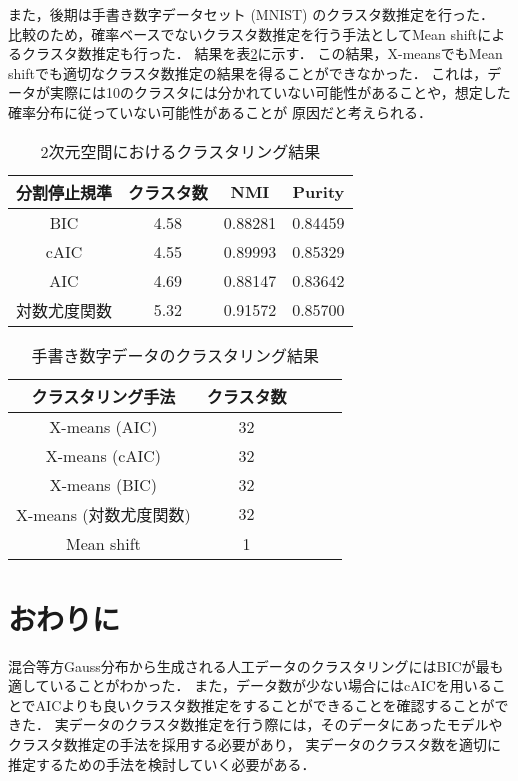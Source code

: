 \documentclass[twocolumn, 10.5pt,a4j]{ltjsarticle}
\def\tableref#1{表\ref{#1}}
\begin{document}
また，後期は手書き数字データセット (MNIST) のクラスタ数推定を行った．
比較のため，確率ベースでないクラスタ数推定を行う手法としてMean shiftによるクラスタ数推定も行った．
結果を\tableref{table:mnist}に示す．
この結果，X-meansでもMean shiftでも適切なクラスタ数推定の結果を得ることができなかった．
これは，データが実際には10のクラスタには分かれていない可能性があることや，想定した確率分布に従っていない可能性があることが
原因だと考えられる．

\begin{table}[htb]
  \centering
  \caption{2次元空間におけるクラスタリング結果}
  \label{table:2dim}
  \begin{tabular}{|c|c|c|c|} \hline
    分割停止規準 & クラスタ数 & NMI & Purity \\\hline
    BIC  & 4.58 & 0.88281 & 0.84459\\
    cAIC & 4.55 & 0.89993 & 0.85329\\
    AIC  & 4.69 & 0.88147 & 0.83642\\
    対数尤度関数 & 5.32 & 0.91572 & 0.85700\\\hline
  \end{tabular}
\end{table}

\begin{table}[htb]
  \centering
  \caption{手書き数字データのクラスタリング結果}
  \label{table:mnist}
  \begin{tabular}{|c|c|c|c|c|} \hline
    クラスタリング手法 & クラスタ数\\\hline
    X-means (AIC) & 32\\
    X-means (cAIC) & 32\\
    X-means (BIC) & 32\\
    X-means (対数尤度関数)& 32\\
    Mean shift & 1\\\hline
  \end{tabular}
\end{table}

\section{おわりに}
混合等方Gauss分布から生成される人工データのクラスタリングにはBICが最も適していることがわかった．
また，データ数が少ない場合にはcAICを用いることでAICよりも良いクラスタ数推定をすることができることを確認することができた．
実データのクラスタ数推定を行う際には，そのデータにあったモデルやクラスタ数推定の手法を採用する必要があり，
実データのクラスタ数を適切に推定するための手法を検討していく必要がある．
\end{document}
